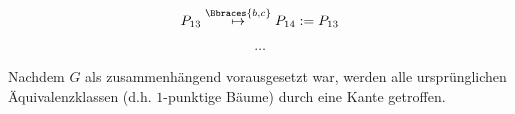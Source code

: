\begin{solution}
\begin{enumerate}[label = \arabic*.]
    \begin{align*}
        P_{13}
        \stackrel
        {
            \Bbraces{b, c}
        }{
            \mapsto
        }
        P_{14} := P_{13}
    \end{align*}

    \begin{align*}
        \dots
    \end{align*}

    Nachdem $G$ als zusammenhängend vorausgesetzt war, werden alle ursprünglichen Äquivalenzklassen (d.h. $1$-punktige Bäume) durch eine Kante getroffen.

\end{enumerate}

\end{solution}

